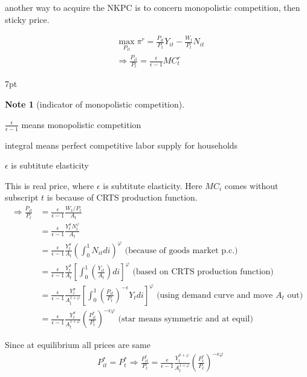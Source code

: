 \documentclass{article}
\newenvironment{blueblock}{
\def\FrameCommand{
  \hspace{1pt}
    {\color{DarkBlue}
    \vrule width 2pt}
    {\color{blueshade}
    \vrule width 4pt}
  \colorbox{blueshade}
}
\MakeFramed{
  \advance
  \hsize-
  \width
  \FrameRestore}
\noindent\hspace{-4.55pt}%
\begin{adjustwidth}{}{7pt}
\vspace{2pt}\vspace{2pt}
}
{\vspace{2pt}\end{adjustwidth}\endMakeFramed}
\newtheorem{note}{Note}
\begin{document}
another way to acquire the NKPC is to concern monopolistic competition, then sticky price. 

\begin{align}
& \max\limits_{P_{it}} \pi^r =\frac{P_{it}}{P_t}Y_{it}-\frac{W_t}{P_t}N_{it}
\\& \Rightarrow \frac{P_{it}}{P_t}=\frac{\epsilon}{\epsilon-1}MC^r_t
\end{align}

\begin{blueblock}
\begin{note}[indicator of monopolistic competition]
\end{note}

$\frac{\epsilon}{\epsilon-1}$ means monopolistic competition

integral means perfect competitive labor supply for households

$\epsilon$ is subtitute elasticity

\end{blueblock}

This is real price, where $\epsilon$ is subtitute elasticity. Here $MC_i$ comes without subscript $t$ is because of CRTS production function.
\begin{align}
\Rightarrow \frac{P_{it}}{P_t} &=\frac{\epsilon}{\epsilon-1} \frac{W_t/P_t}{A_t}
\\& = \frac{\epsilon}{\epsilon-1} \frac{Y_t^\sigma N_t^\varphi}{A_t}
\\& = \frac{\epsilon}{\epsilon-1} \frac{Y_t^\sigma}{A_t} (\int_0^1 N_{it}di)^\varphi
\text{ (because of goods market p.c.)} 
\\& = 
\frac{\epsilon}{\epsilon-1} \frac{Y_t^\sigma}{A_t} [\int_0^1 (\frac{Y_{it}}{A_t})di]^\varphi
\text{ (based on CRTS production function)}
\\& = \frac{\epsilon}{\epsilon-1} \frac{Y_t^\sigma}{A_t^{1+\varphi}} [\int_0^1 (\frac{P_{it}}{P_t})^{-\epsilon} Y_t di]^\varphi
\text{ (using demand curve and move $A_t$ out)}
\\& = 
\frac{\epsilon}{\epsilon-1} \frac{Y_t^\sigma}{A_t^{1+\varphi}} (\frac{P^*_{it}}{P_t})^{-\epsilon\varphi}
\text{ (star means symmetric and at equil)}
\end{align}

Since at equilibrium all prices are same
\begin{align}
& P^{*}_{it}=P_{t}^{*} \Rightarrow \frac{P^{*}_{it}}{P_t}=\frac{\epsilon}{\epsilon-1} \frac{Y_t^{\sigma+\varphi}}{A_t^{1+\varphi}} (\frac{P^*_{t}}{P_t})^{-\epsilon\varphi}
\end{align}
\end{document}
